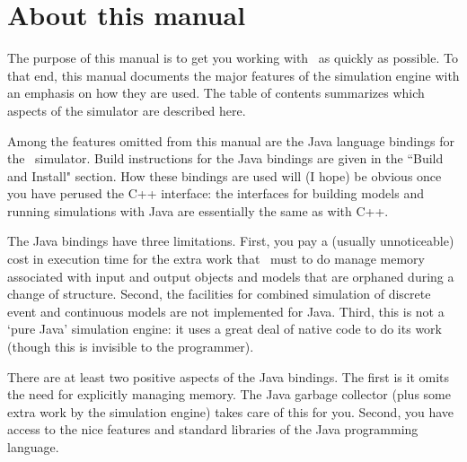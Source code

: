 \chapter{About this manual}
The purpose of this manual is to get you working with \adevs\ as quickly as possible. To that end, this manual documents the major features of the simulation engine with an emphasis on how they are used. The table of contents summarizes which aspects of the simulator are described here.

Among the features omitted from this manual are the Java language bindings for the \adevs\ simulator. Build instructions for the Java bindings are given in the ``Build and Install" section. How these bindings are used will (I hope) be obvious once you have perused the C++ interface: the interfaces for building models and running simulations with Java are essentially the same as with C++.

The Java bindings have three limitations. First, you pay a (usually unnoticeable) cost in execution time for the extra work that \adevs\ must to do manage memory associated with input and output objects and models that are orphaned during a change of structure. Second, the facilities for combined simulation of discrete event and continuous models are not implemented for Java. Third, this is not a `pure Java' simulation engine: it uses a great deal of native code to do its work (though this is invisible to the programmer).

There are at least two positive aspects of the Java bindings. The first is it omits the need for explicitly managing memory. The Java garbage collector (plus some extra work by the simulation engine) takes care of this for you. Second, you have access to the nice features and standard libraries of the Java programming language.

